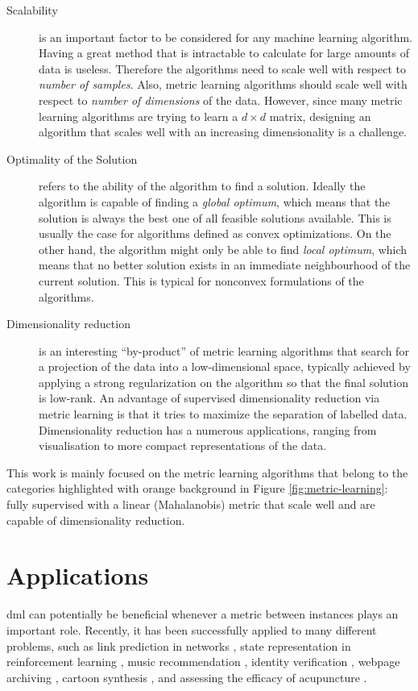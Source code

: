 \documentclass[12pt,a4paper]{report}
\begin{document}
\begin{description}
\item [Scalability] is an important factor to be considered for any machine learning algorithm. Having a great method that is intractable to calculate for large amounts of data is useless. Therefore the algorithms need to scale well with respect to \textit{number of samples}. Also, metric learning algorithms should scale well with respect to \textit{number of dimensions} of the data. However, since many metric learning algorithms are trying to learn a $d \times d$ matrix, designing an algorithm that scales well with an increasing dimensionality is a challenge.

\item [Optimality of the Solution] refers to the ability of the algorithm to find a solution. Ideally the algorithm is capable of finding a \textit{global optimum}, which means that the solution is always the best one of all feasible solutions available. This is usually the case for algorithms defined as convex optimizations. On the other hand, the algorithm might only be able to find \textit{local optimum}, which means that no better solution exists in an immediate neighbourhood of the current solution. This is typical for nonconvex formulations of the algorithms.

\item [Dimensionality reduction] is an interesting ``by-product'' of metric learning algorithms that search for a projection of the data into a low-dimensional space, typically achieved by applying a strong regularization on the algorithm so that the final solution is low-rank. An advantage of supervised dimensionality reduction via metric learning is that it tries to maximize the separation of labelled data. Dimensionality reduction has a numerous applications, ranging from visualisation to more compact representations of the data.
\end{description}

This work is mainly focused on the metric learning algorithms that belong to the categories highlighted with orange background in Figure \ref{fig:metric-learning}: fully supervised with a linear (Mahalanobis) metric that scale well and are capable of dimensionality reduction. 

\section{Applications} \label{chap:intro:applications}

\Acl{dml} can potentially be beneficial whenever a metric between instances plays an important role. Recently, it has been successfully applied to many different problems, such as link prediction in networks \citep{shaw2011learning}, state representation in reinforcement learning \citep{taylor2011metric}, music recommendation \citep{mcfee2012learning}, identity verification \citep{ben2012improved}, webpage archiving \citep{law2012structural}, cartoon synthesis \citep{yu2012semisupervised}, and assessing the efficacy of acupuncture \citep{liang2012learning}.
\end{document}
